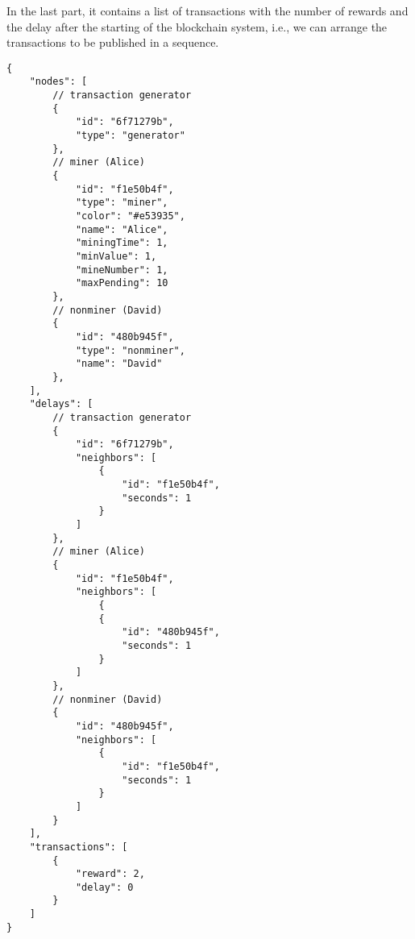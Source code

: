 In the last part, it contains a list of transactions with the number of rewards and the delay after the starting of the blockchain system, i.e., we can arrange the transactions to be published in a sequence.

\begin{lstlisting}[caption={Sample of Configuration File}, label={lst:sample of configuration file}]
{
    "nodes": [
        // transaction generator
        {
            "id": "6f71279b",
            "type": "generator"
        },
        // miner (Alice)
        {
            "id": "f1e50b4f",
            "type": "miner",
            "color": "#e53935",
            "name": "Alice",
            "miningTime": 1,
            "minValue": 1,
            "mineNumber": 1,
            "maxPending": 10
        },
        // nonminer (David)
        {
            "id": "480b945f",
            "type": "nonminer",
            "name": "David"
        },
    ],
    "delays": [
        // transaction generator
        {
            "id": "6f71279b",
            "neighbors": [
                {
                    "id": "f1e50b4f",
                    "seconds": 1
                }
            ]
        },
        // miner (Alice)
        {
            "id": "f1e50b4f",
            "neighbors": [
                {
                {
                    "id": "480b945f",
                    "seconds": 1
                }
            ]
        },
        // nonminer (David)
        {
            "id": "480b945f",
            "neighbors": [
                {
                    "id": "f1e50b4f",
                    "seconds": 1
                }
            ]
        }
    ],
    "transactions": [
        {
            "reward": 2,
            "delay": 0
        }
    ]
}
\end{lstlisting}